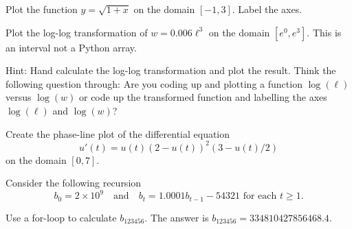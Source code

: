 \documentclass[../main.tex]{subfiles}
\begin{document}
\begin{computing}
  Plot the function \(y = \sqrt{1 + x}\) on the domain \([-1,3]\). Label the axes.
\end{computing}

\begin{computing}
  Plot the log-log transformation of \(w = 0.006 \ell^{3}\) on the domain \([e^{0}, e^{3}]\). This is an interval not a Python array.

  Hint: Hand calculate the log-log transformation and plot the result.  Think the following question through: Are you coding up and plotting a function \(\log(\ell)\) versus \(\log(w)\) or code up the transformed function and labelling the axes \(\log(\ell)\) and \(\log(w)\)?

\end{computing}

\begin{computing}
  Create the phase-line plot of the differential equation 
  \[
    u'(t) = u(t) (2 - u(t))^{2}(3 - u(t)/2)
  \]
  on the domain \([0, 7]\).
\end{computing}


\begin{computing}
  Consider the following recursion
  \[
    b_{0} = 2 \times 10^{9} \quad\text{and}\quad b_{t} = 1.0001 b_{t-1} - 54321 \text{ for each } t \ge 1.
  \]

  Use a for-loop to calculate \(b_{123456}\).  The answer is \(b_{123456} = 334810427856468.4\).
\end{computing}
\clearpage
\end{document}
